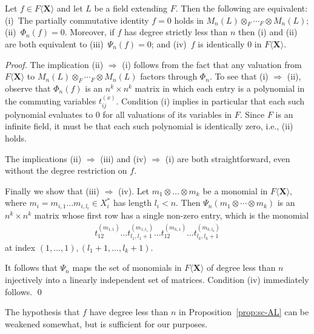 \documentclass[runningheads]{llncs}
\begin{document}
\begin{proposition}
Let $f \in F \langle \boldsymbol{X} \rangle$ and let $L$ be a field
extending $F$.  Then the following are equivalent: (i)~The partially
commutative identity $f=0$ holds in $M_n(L) \otimes_F \cdots_F \otimes
M_n(L)$; (ii)~$\Phi_n(f) = 0$.  Moreover, if $f$ has degree strictly
less than $n$ then (i) and (ii) are both equivalent to
(iii)~$\Psi_n(f) = 0$; and (iv)~$f$ is identically $0$ in $F \langle
\boldsymbol{X} \rangle$.
\label{prop:sc-AL}
\end{proposition}
\begin{proof}
  The implication (ii) $\Rightarrow$ (i) follows from the fact that
  any valuation from $F \langle \boldsymbol{X} \rangle$ to $M_n(L)
  \otimes_F \cdots_F \otimes M_n(L)$ factors through $\Phi_n$.  To
  see that (i) $\Rightarrow$ (ii), observe that $\Phi_n(f)$ is an
  $n^k\times n^k$ matrix in which each entry is a polynomial in the
  commuting variables $t^{(x)}_{ij}$.  Condition (i) implies in particular
  that each such polynomial evaluates to $0$ for all valuations of its
  variables in $F$.  Since $F$ is an infinite field, it must be that
  each such polynomial is identically zero, i.e., (ii) holds.

  The implications (ii) $\Rightarrow$ (iii) and (iv) $\Rightarrow$ (i)
  are both straightforward, even without the degree restriction on $f$.

Finally we show that (iii) $\Rightarrow$ (iv).  Let $m_1 \otimes
\ldots \otimes m_k$ be a monomial in $F \langle \boldsymbol{X}
\rangle$, where $m_i = m_{i,1} \ldots m_{i,l_i} \in X_i^*$ has length
$l_i < n$.  Then $\Psi_n(m_1 \otimes \cdots \otimes m_k)$ is an $n^k
\times n^k$ matrix whose first row has a single non-zero entry, which
is the monomial
\begin{gather}
t_{12}^{(m_{1,1})}\ldots t_{l_1,l_1+1}^{(m_{1,l_1})} \ldots
t_{12}^{(m_{k,1})}\ldots t_{l_k,l_k+1}^{(m_{k,l_k})} 
\label{eq:psi2}
\end{gather}
at index $(1,\ldots,1),(l_1+1,\ldots,l_k+1)$.

It follows that $\Psi_n$ maps the set of monomials in $F \langle
\boldsymbol{X} \rangle$ of degree less than $n$ injectively into a 
linearly independent set of matrices.  Condition (iv)
immediately follows.  \qed
\end{proof}
The hypothesis that $f$ have degree less than $n$ in
Proposition~\ref{prop:sc-AL} can be weakened somewhat, but is
sufficient for our purposes.
\end{document}
